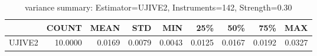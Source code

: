 \begin{table}[ht]
\centering
\caption{variance summary: Estimator=UJIVE2, Instruments=142, Strength=0.30}
\begin{tabular}{lrrrrrrrr}
\toprule
 & COUNT & MEAN & STD & MIN & 25\% & 50\% & 75\% & MAX \\
\midrule
UJIVE2 & 10.0000 & 0.0169 & 0.0079 & 0.0043 & 0.0125 & 0.0167 & 0.0192 & 0.0327 \\
\bottomrule
\end{tabular}
\end{table}
